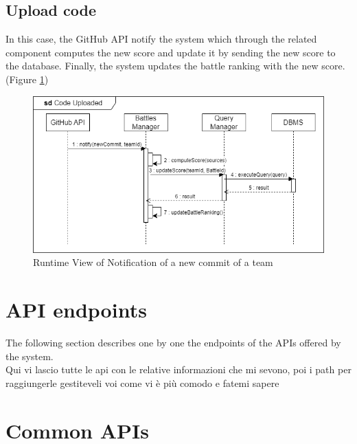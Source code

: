 \subsection{Upload code}
In this case, the GitHub API notify the system which through the related component computes the new score and update it by sending the new score to the database. Finally, the system updates the battle ranking with the new score. (Figure \ref{fig:RuntimeView_CodeUploaded})
\begin{figure}[H]
    \centering
    \includegraphics[width=\textwidth]{images/runtimeviews/RuntimeView_CodeUploaded.png}
    \caption{Runtime View of Notification of a new commit of a team}
    \label{fig:RuntimeView_CodeUploaded}
\end{figure}

\section{API endpoints}

\lstset{
    basicstyle=\ttfamily\footnotesize,
    showstringspaces=false,
    tabsize=2,
    breaklines=true
}

The following section describes one by one the endpoints of the APIs offered by the system.\\
{\color{red} Qui vi lascio tutte le api con le relative informazioni che mi sevono, poi i path per raggiungerle gestiteveli voi come vi è più comodo e fatemi sapere}

\section*{Common APIs}

